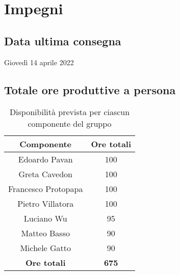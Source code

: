 \section{Impegni}
\subsection{Data ultima consegna}
Giovedì 14 aprile 2022
\subsection{Totale ore produttive a persona}
\begin{center}
\begin{table}[!htbp]
	\centering
    \begin{tabular}{c|c}
	\toprule
    \textbf{Componente} & \textbf{Ore totali} \\
    \midrule
    \rowcolor{gray!10} Edoardo Pavan & 100 \\ 
    \hline
    Greta Cavedon & 100 \\ 
    \hline
    \rowcolor{gray!10} Francesco Protopapa &  100 \\
    \hline
    Pietro Villatora &  100 \\
    \hline
    \rowcolor{gray!10}  Luciano Wu & 95\\
    \hline
    Matteo Basso &  90\\
    \hline
    \rowcolor{gray!10}  Michele Gatto & 90\\
    \hline \hline
    \textbf{Ore totali} & \textbf{675}  \\
    \bottomrule
    
    \end{tabular}
    \caption{Disponibilità prevista per ciascun componente del gruppo}
\end{table}
\end{center}


